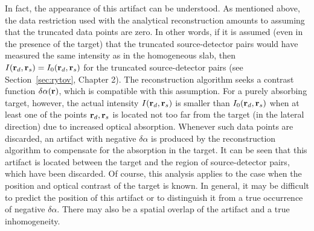 In fact, the appearance of this artifact can be understood. As mentioned above, the data restriction used with the analytical reconstruction amounts to assuming that the truncated data points are zero. In other words, if it is assumed (even in the presence of the target) that the truncated source-detector pairs would have measured the same intensity as in the homogeneous slab, then $I(\mathbf{r}_d,\mathbf{r}_s) = I_0(\mathbf{r}_d,\mathbf{r}_s)$ for the truncated source-detector pairs (see Section~\ref{sec:rytov}, Chapter 2). The reconstruction algorithm seeks a contrast function $\delta\alpha(\mathbf{r})$, which is compatible with this assumption.  For a purely absorbing target, however, the actual intensity $I(\mathbf{r}_d,\mathbf{r}_s)$ is smaller than $I_0(\mathbf{r}_d,\mathbf{r}_s)$ when at least one of the points $\mathbf{r}_d,\mathbf{r}_s$ is located not too far from the target (in the lateral direction) due to increased optical absorption. Whenever such data points are discarded, an artifact with negative $\delta\alpha$ is produced by the reconstruction algorithm to compensate for the absorption in the target. It can be seen that this artifact is located between the target and the region of source-detector pairs, which have been discarded. Of course, this analysis applies to the case when the position and optical contrast of the target is known.  In general, it may be difficult to predict the position of this artifact or to distinguish it from a true occurrence of negative $\delta\alpha$. There may also be a spatial overlap of the artifact and a true inhomogeneity.

